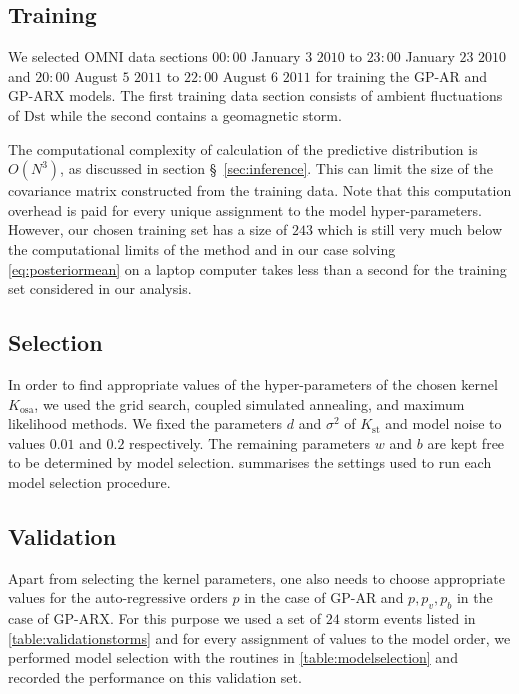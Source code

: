 \subsection*{Training}

We selected OMNI data sections $00:00$ January $3$ $2010$ to $23:00$ January $23$ $2010$ and 
$20:00$ August $5$ $2011$ to $22:00$ August $6$ $2011$ for training the GP-AR and GP-ARX models. 
The first training data section consists of ambient fluctuations of $\mathrm{Dst}$ while the second 
contains a geomagnetic storm.

The computational complexity of calculation of the predictive distribution is $O(N^3)$, as 
discussed in section \S~\ref{sec:inference}. This can limit the size of the covariance matrix 
constructed from the training data. Note that this computation overhead is paid for every unique 
assignment to the model hyper-parameters. However, our chosen training set has a size of $243$ 
which is still very much below the computational limits of the method and in our case solving 
\cref{eq:posteriormean} on a laptop computer takes less than a second for the training set 
considered in our analysis. 

\subsection*{Selection}

In order to find appropriate values of the hyper-parameters of the chosen kernel $K_{\text{osa}}$, 
we used the grid search, coupled simulated annealing, and maximum likelihood methods. We fixed the 
parameters $d$ and $\sigma^2$ of $K_{\text{st}}$ and model noise to values $0.01$ and $0.2$ 
respectively. The remaining parameters $w$ and $b$ are kept free to be determined by model 
selection.  summarises the settings used to run each model selection 
procedure.

\subsection*{Validation}

Apart from selecting the kernel parameters, one also needs to choose appropriate values for the 
auto-regressive orders $p$ in the case of GP-AR and $p, p_v, p_b$ in the case of GP-ARX. For this 
purpose we used a set of $24$ storm events listed in \cref{table:validationstorms} and for every 
assignment of values to the model order, we performed model selection with the routines in 
\cref{table:modelselection} and recorded the performance on this validation set.

